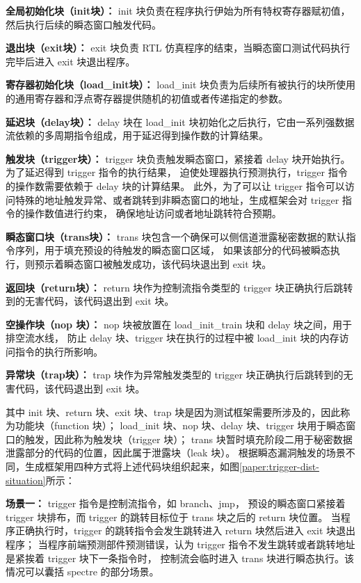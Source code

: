 \textbf{全局初始化块（init块）：}
init 块负责在程序执行伊始为所有特权寄存器赋初值，然后执行后续的瞬态窗口触发代码。\par
\textbf{退出块（exit块）：}
exit 块负责 RTL 仿真程序的结束，当瞬态窗口测试代码执行完毕后进入 exit 块退出程序。\par
\textbf{寄存器初始化块（load\_init块）：}
load\_init 块负责为后续所有被执行的块所使用的通用寄存器和浮点寄存器提供随机的初值或者传递指定的参数。\par
\textbf{延迟块（delay块）：}
delay 块在 load\_init 块初始化之后执行，它由一系列强数据流依赖的多周期指令组成，用于延迟得到操作数的计算结果。\par
\textbf{触发块（trigger块）：}
trigger 块负责触发瞬态窗口，紧接着 delay 块开始执行。为了延迟得到 trigger 指令的执行结果，
迫使处理器执行预测执行，trigger 指令的操作数需要依赖于 delay 块的计算结果。
此外，为了可以让 trigger 指令可以访问特殊的地址触发异常、或者跳转到非瞬态窗口的地址，生成框架会对 trigger 指令的操作数值进行约束，
确保地址访问或者地址跳转符合预期。\par
\textbf{瞬态窗口块（trans块）：}
trans 块包含一个确保可以侧信道泄露秘密数据的默认指令序列，用于填充预设的待触发的瞬态窗口区域，
如果该部分的代码被瞬态执行，则预示着瞬态窗口被触发成功，该代码块退出到 exit 块。\par
\textbf{返回块（return块）：}
return 块作为控制流指令类型的 trigger 块正确执行后跳转到的无害代码，该代码退出到 exit 块。\par
\textbf{空操作块（nop 块）：}
nop 块被放置在 load\_init\_train 块和 delay 块之间，用于排空流水线，
防止 delay 块、trigger 块在执行的过程中被 load\_init 块的内存访问指令的执行所影响。\par
\textbf{异常块（trap块）：}
trap 块作为异常触发类型的 trigger 块正确执行后跳转到的无害代码，该代码退出到 exit 块。\par

其中 init 块、return 块、exit 块、trap 块是因为测试框架需要所涉及的，因此称为功能块（function 块）；
load\_init 块、nop 块、delay 块、trigger 块用于瞬态窗口的触发，因此称为触发块（trigger 块）；
trans 块暂时填充阶段二用于秘密数据泄露部分的代码的位置，因此属于泄露块（leak 块）。
根据瞬态漏洞触发的场景不同，生成框架用四种方式将上述代码块组织起来，如图\ref{paper:trigger-dist-situation}所示：\par

\textbf{场景一：} trigger 指令是控制流指令，如 branch、jmp，
预设的瞬态窗口紧接着 trigger 块排布，而 trigger 的跳转目标位于 trans 块之后的 return 块位置。
当程序正确执行时，trigger 的跳转指令会发生跳转进入 return 块然后进入 exit 块退出程序；
当程序前端预测部件预测错误，认为 trigger 指令不发生跳转或者跳转地址是紧挨着 trigger 块下一条指令时，
控制流会临时进入 trans 块进行瞬态执行。该情况可以囊括 spectre 的部分场景。\par

